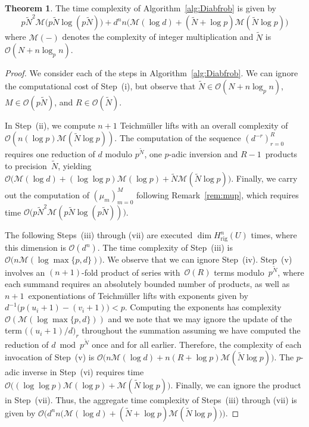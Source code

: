 \documentclass[a4paper,11pt]{article}
\numberwithin{equation}{section}
\providecommand{\Hrig}{H_{\text{rig}}}  %
\providecommand{\cM}{\mathcal{M}} %
\providecommand{\BigOh}{\mathcal{O}} %
\theoremstyle{definition}
\newtheorem{thm}{Theorem}[section]
\begin{document}
\begin{thm} \label{thm:DiagfrobComplexity1}
The time complexity of Algorithm~\ref{alg:Diabfrob} is given by 
\begin{equation*}
p \tilde{N}^2 \cM\bigl(p \tilde{N} \log (p \tilde{N})\bigr)
    + d^n n \bigl( \cM(\log d) + (\tilde{N} + \log p) \cM(\tilde{N} \log p) \bigr)
\end{equation*}
where $\cM(-)$ denotes the complexity of integer multiplication and 
$\tilde{N}$ is $\BigOh(N + n \log_p n)$.
\end{thm}

\begin{proof}
We consider each of the steps in Algorithm~\ref{alg:Diabfrob}. 
We can ignore the computational cost of {Step~(i)}, but observe 
that $\tilde{N} \in \BigOh(N + n \log_p n)$, 
$M \in \BigOh(p \tilde{N})$, and $R \in \BigOh(\tilde{N})$.  

In {Step~(ii)}, we compute $n+1$ Teichm\"uller lifts with an 
overall complexity of $\BigOh(n (\log p) \cM(\tilde{N} \log p))$. 
The computation of the sequence $(d^{-r})_{r=0}^{R}$ requires 
one reduction of $d$ modulo $p^{\tilde{N}}$, one $p$-adic inversion 
and $R-1$~products to precision~$\tilde{N}$, yielding 
$\BigOh\bigl(\cM(\log d) + (\log \log p) \cM(\log p) + \tilde{N} \cM(\tilde{N} \log p)\bigr)$. 
Finally, we carry out the computation of $(\mu_m)_{m=0}^{M}$ following 
Remark~\ref{rem:mup}, which requires time 
$\BigOh\bigl(p \tilde{N}^2 \cM(p \tilde{N} \log(p \tilde{N}))\bigr)$.

The following {Steps~(iii) through (vii)} are executed 
$\dim \Hrig^{n}(U)$ times, where this dimension 
is $\BigOh(d^n)$.
The time complexity of {Step~(iii)} is 
$\BigOh\bigl(n \cM(\log \max\{p,d\})\bigr)$.
We observe that we can ignore {Step~(iv)}.
Step~(v) involves an $(n+1)$-fold product of series 
with~$\BigOh(R)$ terms modulo~$p^{\tilde{N}}$, where each summand 
requires an absolutely bounded number of products, as well as 
$n+1$~exponentiations of Teichm\"uller lifts with exponents given 
by $d^{-1} \bigl(p (u_i+1) - (v_i+1)\bigr) < p$.  Computing the 
exponents has complexity $\BigOh(\cM(\log \max\{p,d\}))$ and 
we note that we may ignore the update of the term 
\mbox{$\bigl((u_i+1)/d\bigr)_r$} throughout the summation 
assuming we have computed the reduction of $d \bmod{p^{\tilde{N}}}$ 
once and for all earlier.  Therefore, the complexity of each 
invocation of {Step~(v)} is 
$\BigOh\bigl( n \cM(\log d) + n (R + \log p) \cM(\tilde{N} \log p)\bigr)$.  
The $p$-adic inverse in {Step~(vi)} requires time 
$\BigOh\bigl((\log \log p) \cM(\log p) + \cM(\tilde{N} \log p)\bigr)$.
Finally, we can ignore the product in {Step~(vii)}.  
Thus, the aggregate time complexity of {Steps~(iii)} through {(vii)} 
is given by 
$\BigOh\bigl(d^n n \bigl( \cM(\log d) + (\tilde{N} + \log p) \cM(\tilde{N} \log p) \bigr)\bigr)$.
\end{proof}
\end{document}
